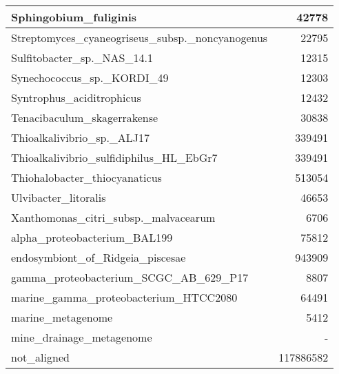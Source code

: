 \documentclass[12pt,a4paper]{article}
\begin{document}
\begin{table}[ht]
\begin{center}
\begin{tabular}{|l*{1}{|r}|}
Sphingobium\_fuliginis & 42778 \\ \hline
Streptomyces\_cyaneogriseus\_subsp.\_noncyanogenus & 22795 \\ \hline
Sulfitobacter\_sp.\_NAS\_14.1 & 12315 \\ \hline
Synechococcus\_sp.\_KORDI\_49 & 12303 \\ \hline
Syntrophus\_aciditrophicus & 12432 \\ \hline
Tenacibaculum\_skagerrakense & 30838 \\ \hline
Thioalkalivibrio\_sp.\_ALJ17 & 339491 \\ \hline
Thioalkalivibrio\_sulfidiphilus\_HL\_EbGr7 & 339491 \\ \hline
Thiohalobacter\_thiocyanaticus & 513054 \\ \hline
Ulvibacter\_litoralis & 46653 \\ \hline
Xanthomonas\_citri\_subsp.\_malvacearum & 6706 \\ \hline
alpha\_proteobacterium\_BAL199 & 75812 \\ \hline
endosymbiont\_of\_Ridgeia\_piscesae & 943909 \\ \hline
gamma\_proteobacterium\_SCGC\_AB\_629\_P17 & 8807 \\ \hline
marine\_gamma\_proteobacterium\_HTCC2080 & 64491 \\ \hline
marine\_metagenome & 5412 \\ \hline
mine\_drainage\_metagenome & - \\ \hline
not\_aligned & 117886582 \\ \hline
\end{tabular}
\end{center}
\end{table}
\end{document}
